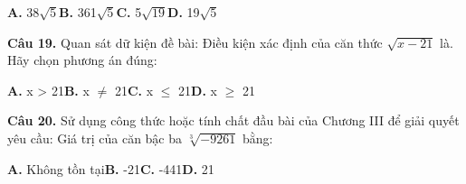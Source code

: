 \documentclass[11pt,a4paper]{article}
\begin{document}
\hspace*{1.5em}\textbf{A.} 38$\sqrt{5}$\quad\quad \textbf{B.} 361$\sqrt{5}$\quad\quad \textbf{C.} 5$\sqrt{19}$\quad\quad \textbf{D.} 19$\sqrt{5}$\par\vspace{2pt}
\textbf{\color{primary} Câu 19.} Quan sát dữ kiện đề bài: Điều kiện xác định của căn thức $\sqrt{x - 21}$ là. Hãy chọn phương án đúng:\par
\hspace*{1.5em}\textbf{A.} x > 21\quad\quad \textbf{B.} x $\ne$ 21\quad\quad \textbf{C.} x $\le$ 21\quad\quad \textbf{D.} x $\ge$ 21\par\vspace{2pt}
\textbf{\color{primary} Câu 20.} Sử dụng công thức hoặc tính chất đầu bài của Chương III để giải quyết yêu cầu: Giá trị của căn bậc ba $\sqrt[3]{-9261}$ bằng:\par
\hspace*{1.5em}\textbf{A.} Không tồn tại\quad\quad \textbf{B.} -21\quad\quad \textbf{C.} -441\quad\quad \textbf{D.} 21\par\vspace{2pt}
\end{document}

